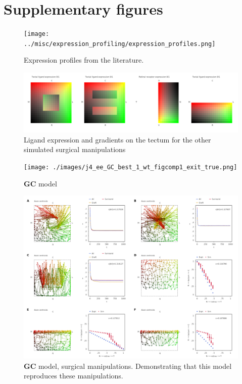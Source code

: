 \documentclass[11pt, a4paper]{article}
\begin{document}
\section*{Supplementary figures}

\begin{figure}
\texttt{[image: ../misc/expression\_profiling/expression\_profiles.png]}
\caption{Expression profiles from the literature.}
\label{f:expressions}
\end{figure}

\begin{figure}
\includegraphics[width=\linewidth]{./images/expressions_manipulations.png}
\caption{Ligand expression and gradients on the tectum for the
other simulated surgical manipulations}
\label{f:tmanip}
\end{figure}

\begin{figure}
\texttt{[image: ./images/j4\_ee\_GC\_best\_1\_wt\_figcomp1\_exit\_true.png]}
\caption{$\mathbf{GC}$ model}
\label{f:GC}
\end{figure}

\begin{figure}
\includegraphics[width=\linewidth]{./images/fig_GC_surgical.png}
\caption{$\mathbf{GC}$ model, surgical manipulations. Demonstrating that this
model reproduces these manipulations.}
\label{f:GCsurg}
\end{figure}
\end{document}
